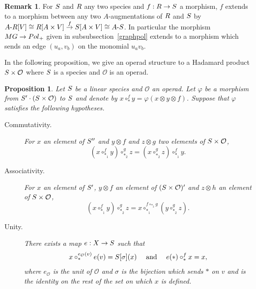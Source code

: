 \documentclass[11pt]{article}
\newtheorem{prop}[theo]{Proposition}
\theoremstyle{definition}
\newtheorem{rema}[theo]{Remark}
\numberwithin{equation}{section}
\newcommand{\spe}[1]{\normalfont{\textsc{#1}}}
\newcommand{\comp}[1][\ast]{\circ_{#1}}
\newcommand{\MG}{\spe{MG}}
\newcommand{\Poly}{\spe{Pol}_+}
\newcommand{\augm}[2]{#1\text{-}#2}
\newcommand{\Operad}{\mathcal{O}}
\begin{document}
\begin{rema} \label{rem_bij_graphpol}
    For $\spe{S}$ and $\spe{R}$ any two species and $f:\spe{R}\to\spe{S}$ a morphism, $f$ extends to a 
    morphism between any two $A$-augmentations of $\spe{R}$ and $\spe{S}$ by 
    $\augm{A}{\spe{R}}[V]\cong\spe{R}[A\times V]\stackrel{f}{\to}\spe{S}[A\times V]\cong\augm{A}{\spe{S}}$. 
    In particular the morphism $\MG\to\Poly$ given in subsubsection~\ref{graphpol} extends to a morphism 
    which sends an edge $(u_a,v_b)$ on the monomial $u_av_b$.
\end{rema}

In the following proposition, we give an operad structure to a Hadamard product $\spe{S}\times\Operad$ 
where $\spe{S}$ is a species and $\Operad$ is an operad. 
\begin{prop}\label{prop_semiprod}
    Let $\spe{S}$ be a linear species and $\Operad$ an operad. Let $\varphi$ be a morphism from 
    $\spe{S}'\cdot(\spe{S}\times\Operad)$ to $\spe{S}$ and denote by $x\comp^f y=\varphi(x\otimes y\otimes f)$.
    Suppose that $\varphi$ satisfies the following hypotheses. 
    \begin{description}
        \item[Commutativity.] For $x$ an element of $\spe{S}''$ and $y\otimes f$ and $z\otimes g$ two elements 
        of $\spe{S}\times\Operad$,
        \begin{equation}\label{prod_sd_eq1}
            (x\comp[\ast_1]^f y)\comp[\ast_2]^g z  = (x\comp[\ast_2]^g z)\comp[\ast_1]^f y.
        \end{equation}
        \item[Associativity.] For $x$ an element of $\spe{S}'$, $y\otimes f$ an element of 
        $(\spe{S}\times\Operad)'$ and $z\otimes h$ an element of $\spe{S}\times\Operad$,
        \begin{equation}\label{prod_sd_eq2} 
            (x\comp[\ast_1]^f y)\comp[\ast_2]^g z = x\comp[\ast_1]^{f\comp[\ast_2] g}(y\comp[\ast_2]^g z).
        \end{equation}
        \item[Unity.] There exists a map $e:\spe{X}\rightarrow \spe{S}$ such that 
        \begin{equation}\label{prod_sd_eq3}
            x\comp^{e_{\Operad}(v)}e(v) = \spe{S}[\sigma](x) \quad \text{ and }\quad e(\ast)\comp^f x = x,
        \end{equation} 
        where $e_{\Operad}$ is the unit of $\Operad$ and $\sigma$ is the bijection which sends $\ast$ on 
        $v$ and is the identity on the rest of the set on which $x$ is defined.

\end{description}
\end{prop}
\end{document}

